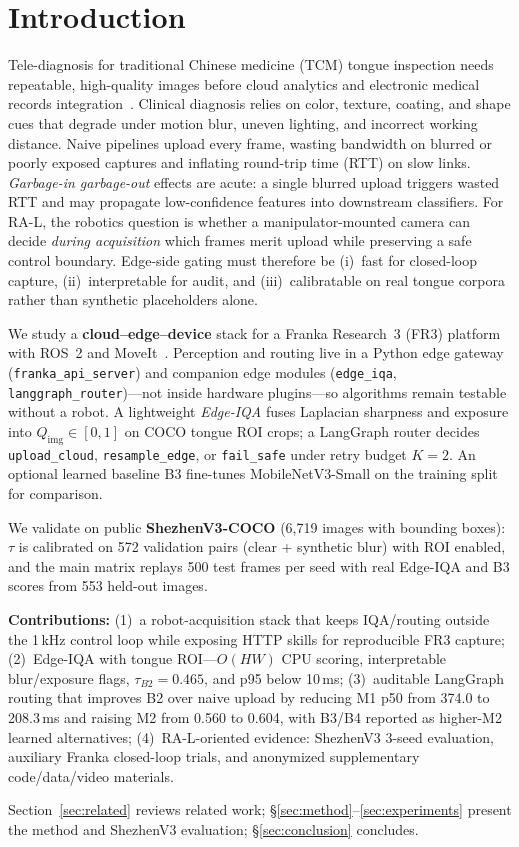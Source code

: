 \section{Introduction}
\label{sec:intro}

Tele-diagnosis for traditional Chinese medicine (TCM) tongue inspection needs repeatable, high-quality images before cloud analytics and electronic medical records integration~\cite{zhang2020tongue,qi2016tongue}.
Clinical diagnosis relies on color, texture, coating, and shape cues that degrade under motion blur, uneven lighting, and incorrect working distance.
Naive pipelines upload every frame, wasting bandwidth on blurred or poorly exposed captures and inflating round-trip time (RTT) on slow links.
\emph{Garbage-in garbage-out} effects are acute: a single blurred upload triggers wasted RTT and may propagate low-confidence features into downstream classifiers.
For RA-L, the robotics question is whether a manipulator-mounted camera can decide \emph{during acquisition} which frames merit upload while preserving a safe control boundary.
Edge-side gating must therefore be (i)~fast for closed-loop capture, (ii)~interpretable for audit, and (iii)~calibratable on real tongue corpora rather than synthetic placeholders alone.

We study a \textbf{cloud--edge--device} stack for a Franka Research~3 (FR3) platform with ROS~2 and MoveIt~\cite{moore2021ros2,chitta2009moveit}.
Perception and routing live in a Python edge gateway (\texttt{franka\_api\_server}) and companion edge modules (\texttt{edge\_iqa}, \texttt{langgraph\_router})---not inside hardware plugins---so algorithms remain testable without a robot.
A lightweight \emph{Edge-IQA} fuses Laplacian sharpness and exposure into $Q_{\mathrm{img}}\in[0,1]$ on COCO tongue ROI crops; a LangGraph router decides \texttt{upload\_cloud}, \texttt{resample\_edge}, or \texttt{fail\_safe} under retry budget $K{=}2$.
An optional learned baseline B3 fine-tunes MobileNetV3-Small on the training split for comparison.

We validate on public \textbf{ShezhenV3-COCO} (6{,}719 images with bounding boxes): $\tau$ is calibrated on 572 validation pairs (clear + synthetic blur) with ROI enabled, and the main matrix replays 500 test frames per seed with real Edge-IQA and B3 scores from 553 held-out images.

\textbf{Contributions:} (1)~a robot-acquisition stack that keeps IQA/routing outside the 1\,kHz control loop while exposing HTTP skills for reproducible FR3 capture;
(2)~Edge-IQA with tongue ROI---$O(HW)$ CPU scoring, interpretable blur/exposure flags, $\tau_{B2}{=}0.465$, and p95 below 10\,ms;
(3)~auditable LangGraph routing that improves B2 over naive upload by reducing M1 p50 from 374.0 to 208.3\,ms and raising M2 from 0.560 to 0.604, with B3/B4 reported as higher-M2 learned alternatives;
(4)~RA-L-oriented evidence: ShezhenV3 3-seed evaluation, auxiliary Franka closed-loop trials, and anonymized supplementary code/data/video materials.

Section~\ref{sec:related} reviews related work; \S\ref{sec:method}--\ref{sec:experiments} present the method and ShezhenV3 evaluation; \S\ref{sec:conclusion} concludes.
